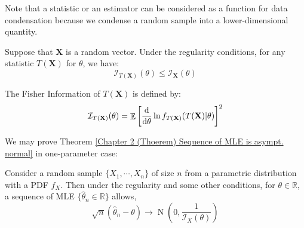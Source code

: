 \documentclass{huhtakm-template-book-v2}
\DeclareMathOperator{\E}{\mathbb{E}}
\DeclareMathOperator{\N}{N}
\begin{document}
\newpage
Note that a statistic or an estimator can be considered as a function for data condensation because we condense a random sample into a lower-dimensional quantity.
\begin{lem}
	Suppose that $\mathbf{X}$ is a random vector. Under the regularity conditions, for any statistic $T(\mathbf{X})$ for $\theta$, we have:
	\begin{equation*}
		\mathcal{I}_{T(\mathbf{X})}(\theta)\leq\mathcal{I}_{\mathbf{X}}(\theta)
	\end{equation*}
\end{lem}
\begin{rem}
	The Fisher Information of $T(\mathbf{X})$ is defined by:
	\begin{equation*}
		\mathcal{I}_{T(\mathbf{X})}(\theta)=\E\left[\odv*{}{\theta}\ln{f_{T(\mathbf{X})}(T(\mathbf{X})|\theta)}\right]^{2}
	\end{equation*}
\end{rem}
We may prove Theorem \ref{Chapter 2 (Thoerem) Sequence of MLE is asympt. normal} in one-parameter case:
\begin{thm}
	Consider a random sample $\{X_{1},\cdots,X_{n}\}$ of size $n$ from a parametric distribution with a PDF $f_{X}$. Then under the regularity and some other conditions, for $\theta\in\mathbb{R}$, a sequence of MLE $\{\hat{\theta}_{n}\in\mathbb{R}\}$ allows,
	\begin{equation*}
		\sqrt{n}(\hat{\theta}_{n}-\theta)\to\N\left(0,\frac{1}{\mathcal{I}_{X}(\theta)}\right)
	\end{equation*}
\end{thm}
\end{document}
